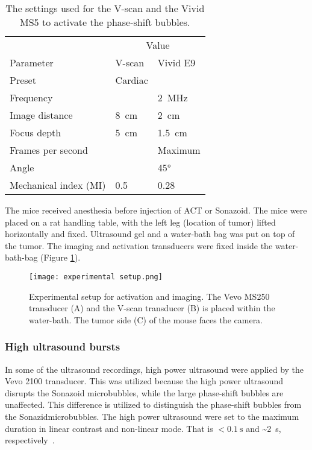  
\begin{table}[htb]
\caption{The settings used for the V-scan and the Vivid MS5 to activate the phase-shift bubbles.}
\label{tab:V-scan vivid}
\begin{center}
\begin{tabular}{@{}l l l @{}}\toprule
& \multicolumn{2}{c}{Value} \\ \cmidrule(r){2-3}
Parameter & V-scan & Vivid E9\\
\midrule
Preset & Cardiac & \\
Frequency & & \SI{2}{\mega\hertz}\\
Image distance & \SI{8}{\centi\meter} & \SI{2}{\centi\meter}\\
Focus depth & \SI{5}{\centi\meter} & \SI{1.5}{\centi\meter}\\
Frames per second & &Maximum\\
Angle & & \ang{45}\\
Mechanical index (MI) & \num{0.5} & \num{0.28} \\
  \bottomrule
\end{tabular}
\end{center}
\end{table}

The mice received anesthesia before injection of ACT\texttrademark{} or Sonazoid\texttrademark{}. The mice were placed on a rat handling table, with the left leg (location of tumor) lifted horizontally and fixed. Ultrasound gel and a water-bath bag was put on top of the tumor. The imaging and activation transducers were fixed inside the water-bath-bag (Figure \ref{Fig:setup}).

\begin{figure}[h]
  \centering
  \texttt{[image: experimental setup.png]}
  \caption{Experimental setup for activation and imaging. The Vevo MS250 transducer (A) and the V-scan transducer (B) is placed within the water-bath. The tumor side (C) of the mouse faces the camera.}
  \label{Fig:setup}
\end{figure}

\subsubsection{High ultrasound bursts}
\label{sec:high US bursts}
In some of the ultrasound recordings, high power ultrasound were applied by the Vevo 2100 transducer. This was utilized because the high power ultrasound disrupts the Sonazoid\texttrademark{} microbubbles, while the large phase-shift bubbles are unaffected. This difference is utilized to distinguish the phase-shift bubbles from the Sonazid\texttrademark microbubbles. The high power ultrasound were set to the maximum duration in linear contrast and non-linear mode. That is \({<}\SI{0.1}{\second}\) and \SI{~2}{\second}, respectively~\cite{Coulthard2009}.


